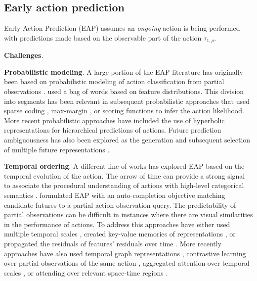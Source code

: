 \documentclass[smallextended,twocolumn,natbib]{svjour3}
\begin{document}
\subsection{Early action prediction}

Early Action Prediction (EAP) assumes an \emph{ongoing} action is being performed with predictions made based on the observable part of the action $\tau_{1,\rho}$. 

\noindent
\textbf{Challenges}.

\noindent
\textbf{Probabilistic modeling}. A large portion of the EAP literature has originally been based on probabilistic modeling of action classification from partial observations \citep{cao2013recognize,hoai2014max,li2012modeling,li2014prediction,ryoo2011human}. \citet{ryoo2011human} used a bag of words based on feature distributions. This division into segments has been relevant in subsequent probabilistic approaches that used sparse coding \citep{cao2013recognize}, max-margin \citep{hoai2014max}, or scoring functions \citep{li2012modeling,li2014prediction} to infer the action likelihood. More recent probabilistic approaches have included the use of hyperbolic representations \citep{suris2021learning} for hierarchical predictions of actions. Future prediction ambiguousness has also been explored as the generation and subsequent selection of multiple future representations \citep{chen2022ambiguousness}.


\noindent
\textbf{Temporal ordering}. A different line of works has explored EAP based on the temporal evolution of the action. The arrow of time \citep{pickup2014seeing} can provide a strong signal to associate the procedural understanding of actions with high-level categorical semantics \citep{misra2016shuffle,zhou2015temporal}. \citet{xu2015activity} formulated EAP with an auto-completion objective matching candidate futures to a partial action observation query. The predictability of partial observations can be difficult in instances where there are visual similarities in the performance of actions. To address this approaches have either used multiple temporal scales \citep{kong2014discriminative}, created key-value memories of representations \citep{kong2018action}, or propagated the residuals of features' residuals over time \citep{zhao2019spatiotemporal}. More recently approaches have also used temporal graph representations \citep{wu2021spatial,wu2021anticipating}, contrastive learning over partial observations of the same action \citep{wang2023magi}, aggregated attention over temporal scales \citep{stergiou2023wisdom}, or attending over relevant space-time regions \citep{rangrej2023glitr}.
\end{document}
